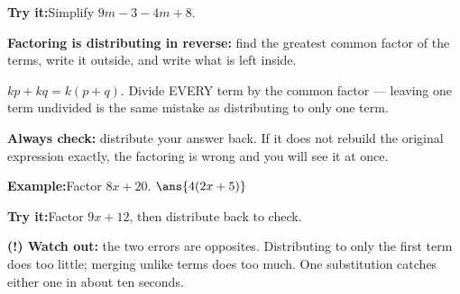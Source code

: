 \documentclass[12pt]{article}
\begin{document}
\begin{tryitbox}
\textbf{Try it:}\quad Simplify $9m - 3 - 4m + 8$.\\[2pt]
\end{tryitbox}


\begin{formulabox}
\textbf{Factoring is distributing in reverse:} find the greatest common factor
of the terms, write it outside, and write what is left inside.\par
\smallskip
$kp + kq = k(p+q)$. Divide EVERY term by the common factor --- leaving one term
undivided is the same mistake as distributing to only one term.\par
\smallskip
\textbf{Always check:} distribute your answer back. If it does not rebuild the
original expression exactly, the factoring is wrong and you will see it at once.
\end{formulabox}

\begin{examplebox}
\textbf{Example:}\quad Factor $8x + 20$.
$\ans{4(2x + 5)}$
\end{examplebox}

\begin{tryitbox}
\textbf{Try it:}\quad Factor $9x + 12$, then distribute back to check.\\[2pt]
\end{tryitbox}

\begin{watchoutbox}
\textbf{(!) Watch out:} the two errors are opposites. Distributing to only the
first term does too little; merging unlike terms does too much. One
substitution catches either one in about ten seconds.
\end{watchoutbox}
\end{document}
